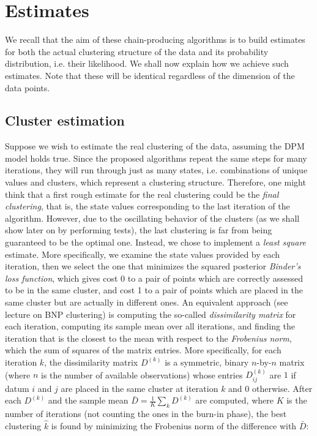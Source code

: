 \chapter{Estimates} \label{chap-esimates-1}
We recall that the aim of these chain-producing algorithms is to build estimates for both the actual clustering structure of the data and its probability distribution, i.e. their likelihood.
We shall now explain how we achieve such estimates.
Note that these will be identical regardless of the dimension of the data points.


\section{Cluster estimation}
Suppose we wish to estimate the real clustering of the data, assuming the DPM model holds true.
Since the proposed algorithms repeat the same steps for many iterations, they will run through just as many states, i.e. combinations of unique values and clusters, which represent a clustering structure.
Therefore, one might think that a first rough estimate for the real clustering could be the \emph{final clustering}, that is, the state values corresponding to the last iteration of the algorithm.
However, due to the oscillating behavior of the clusters (as we shall show later on by performing tests), the last clustering is far from being guaranteed to be the optimal one.
Instead, we chose to implement a \emph{least square} estimate.
More specifically, we examine the state values provided by each iteration, then we select the one that minimizes the squared posterior \emph{Binder's loss function}, which gives cost 0 to a pair of points which are correctly assessed to be in the same cluster, and cost 1 to a pair of points which are placed in the same cluster but are actually in different ones.
An equivalent approach (see \cite{beep-bayes} lecture on BNP clustering) is computing the so-called \emph{dissimilarity matrix} for each iteration, computing its sample mean over all iterations, and finding the iteration that is the closest to the mean with respect to the \emph{Frobenius norm}, which the sum of squares of the matrix entries. 
More specifically, for each iteration $k$, the dissimilarity matrix $D^{(k)}$ is a symmetric, binary $n$-by-$n$ matrix (where $n$ is the number of available observations) whose entries $D^{(k)}_{ij}$ are $1$ if datum $i$ and $j$ are placed in the same cluster at iteration $k$ and $0$ otherwise.
After each $D^{(k)}$ and the sample mean $\bar{D} = \frac{1}{K} \sum_k D^{(k)}$ are computed, where $K$ is the number of iterations (not counting the ones in the burn-in phase), the best clustering $\hat{k}$ is found by minimizing the Frobenius norm of the difference with $\bar{D}$:
